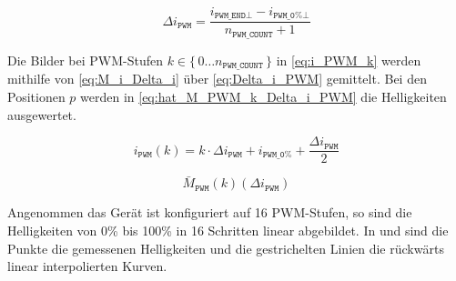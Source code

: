 \begin{equation}\label{eq:Delta_i_PWM}
  \Delta i_\texttt{PWM} = \frac{i_{\texttt{PWM\_END}\bot} - i_{\texttt{PWM\_0\%}\bot} }{n_{\texttt{PWM\_COUNT}} + 1 }
\end{equation}

Die Bilder bei PWM-Stufen $k\in\{\,0 \ldots n_\texttt{PWM\_COUNT}\,\}$ in \eqref{eq:i_PWM_k} werden mithilfe von \eqref{eq:M_i_Delta_i} über \eqref{eq:Delta_i_PWM} gemittelt. Bei den Positionen $p$ werden in \eqref{eq:hat_M_PWM_k_Delta_i_PWM} die Helligkeiten ausgewertet.

\begin{equation}\label{eq:i_PWM_k}
  i_{\texttt{PWM}}(k) = k\cdot \Delta i_\texttt{PWM} + i_{\texttt{PWM\_0\%}} + \frac{\Delta i_\texttt{PWM}}{2}
\end{equation}

\begin{equation}\label{eq:hat_M_PWM_k_Delta_i_PWM}
  \bar{M}_\texttt{PWM}(k)(\Delta i_\texttt{PWM})
\end{equation}

Angenommen das Gerät ist konfiguriert auf 16 PWM-Stufen, so sind die Helligkeiten von 0\% bis 100\% in 16 Schritten linear abgebildet.
In  und  sind die Punkte die gemessenen Helligkeiten und die gestrichelten Linien die rückwärts linear interpolierten Kurven.

